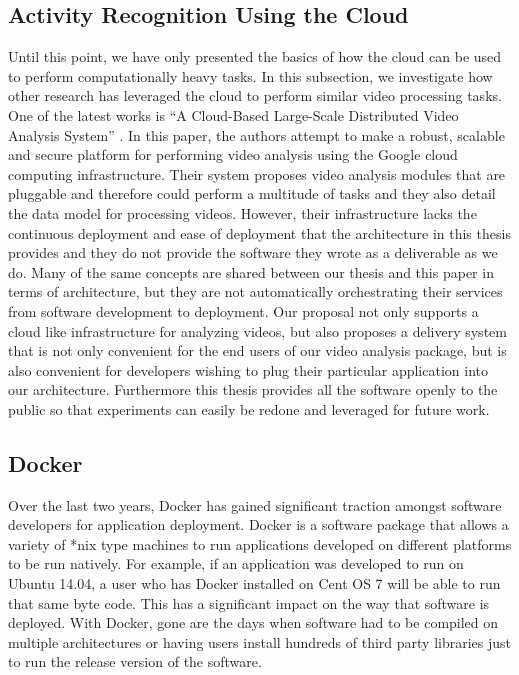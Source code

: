 \subsection{\label{subsection:activity_in_the_cloud}Activity Recognition Using the Cloud}
Until this point, we have only presented the basics of how the cloud can be used
to perform computationally heavy tasks. In this subsection, we investigate how
other research has leveraged the cloud to perform similar video processing tasks.
One of the latest works is ``A Cloud-Based Large-Scale Distributed Video Analysis
System'' \cite{wang2016cloud}. In this paper, the authors attempt to make a
robust, scalable and secure platform for performing video analysis using the
Google cloud computing infrastructure. Their system proposes video analysis
modules that are pluggable and therefore could perform a multitude of tasks and
they also detail the data model for processing videos. However, their infrastructure
lacks the continuous deployment and ease of deployment that the architecture
in this thesis provides and they do not provide the software they wrote as a
deliverable as we do. Many of the same concepts are shared between our thesis
and this paper in terms of architecture, but they are not automatically
orchestrating their services from software development to deployment. Our proposal
not only supports a cloud like infrastructure for analyzing videos, but also proposes
a delivery system that is not only convenient for the end users of our video analysis
package, but is also convenient for developers wishing to plug their particular
application into our architecture. Furthermore this thesis provides all the
software openly to the public so that experiments can easily be redone and leveraged
for future work.

\subsection{\label{subsection:docker}Docker}
Over the last two years, Docker has gained significant traction amongst software
developers for application deployment. Docker is a software package that allows
a variety of *nix type machines to run applications developed on different
platforms to be run natively. For example, if an application was developed to run
on Ubuntu 14.04, a user who has Docker installed on Cent OS 7 will be able to
run that same byte code. This has a significant impact on the way that software
is deployed. With Docker, gone are the days when software had to be compiled on
multiple architectures or having users install hundreds of third
party libraries just to run the release version of the software.

